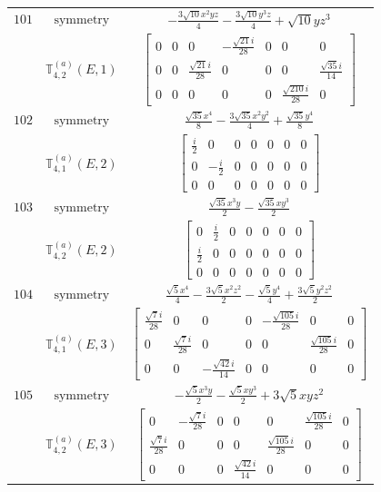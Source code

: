 \documentclass[fleqn,8pt,landscape]{jsarticle}
\begin{document}
\begin{longtable}{ccc}
$ 101 $ & $ \text{symmetry} $ & $ - \frac{3 \sqrt{10} x^{2} y z}{4} - \frac{3 \sqrt{10} y^{3} z}{4} + \sqrt{10} y z^{3} $ \\
$  $ & $ \mathbb{T}_{4,2}^{(a)}(E,1) $ & $ \begin{bmatrix} 0 & 0 & 0 & - \frac{\sqrt{21} i}{28} & 0 & 0 & 0 \\ 0 & 0 & \frac{\sqrt{21} i}{28} & 0 & 0 & 0 & \frac{\sqrt{35} i}{14} \\ 0 & 0 & 0 & 0 & 0 & \frac{\sqrt{210} i}{28} & 0 \end{bmatrix} $ \\ \hline
$ 102 $ & $ \text{symmetry} $ & $ \frac{\sqrt{35} x^{4}}{8} - \frac{3 \sqrt{35} x^{2} y^{2}}{4} + \frac{\sqrt{35} y^{4}}{8} $ \\
$  $ & $ \mathbb{T}_{4,1}^{(a)}(E,2) $ & $ \begin{bmatrix} \frac{i}{2} & 0 & 0 & 0 & 0 & 0 & 0 \\ 0 & - \frac{i}{2} & 0 & 0 & 0 & 0 & 0 \\ 0 & 0 & 0 & 0 & 0 & 0 & 0 \end{bmatrix} $ \\ \hline
$ 103 $ & $ \text{symmetry} $ & $ \frac{\sqrt{35} x^{3} y}{2} - \frac{\sqrt{35} x y^{3}}{2} $ \\
$  $ & $ \mathbb{T}_{4,2}^{(a)}(E,2) $ & $ \begin{bmatrix} 0 & \frac{i}{2} & 0 & 0 & 0 & 0 & 0 \\ \frac{i}{2} & 0 & 0 & 0 & 0 & 0 & 0 \\ 0 & 0 & 0 & 0 & 0 & 0 & 0 \end{bmatrix} $ \\ \hline
$ 104 $ & $ \text{symmetry} $ & $ \frac{\sqrt{5} x^{4}}{4} - \frac{3 \sqrt{5} x^{2} z^{2}}{2} - \frac{\sqrt{5} y^{4}}{4} + \frac{3 \sqrt{5} y^{2} z^{2}}{2} $ \\
$  $ & $ \mathbb{T}_{4,1}^{(a)}(E,3) $ & $ \begin{bmatrix} \frac{\sqrt{7} i}{28} & 0 & 0 & 0 & - \frac{\sqrt{105} i}{28} & 0 & 0 \\ 0 & \frac{\sqrt{7} i}{28} & 0 & 0 & 0 & \frac{\sqrt{105} i}{28} & 0 \\ 0 & 0 & - \frac{\sqrt{42} i}{14} & 0 & 0 & 0 & 0 \end{bmatrix} $ \\ \hline
$ 105 $ & $ \text{symmetry} $ & $ - \frac{\sqrt{5} x^{3} y}{2} - \frac{\sqrt{5} x y^{3}}{2} + 3 \sqrt{5} x y z^{2} $ \\
$  $ & $ \mathbb{T}_{4,2}^{(a)}(E,3) $ & $ \begin{bmatrix} 0 & - \frac{\sqrt{7} i}{28} & 0 & 0 & 0 & \frac{\sqrt{105} i}{28} & 0 \\ \frac{\sqrt{7} i}{28} & 0 & 0 & 0 & \frac{\sqrt{105} i}{28} & 0 & 0 \\ 0 & 0 & 0 & \frac{\sqrt{42} i}{14} & 0 & 0 & 0 \end{bmatrix} $ \\ \hline

\end{longtable}
\end{document}
